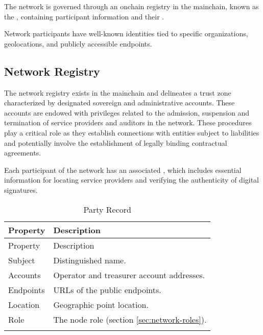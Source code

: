 \documentclass{oc}
\begin{document}
The network is governed through an onchain registry in the \gls{mainchain}, known as the , containing participant information and their .

Network participants have well-known identities tied to specific organizations, geolocations, and publicly accessible endpoints.

\subsection{Network Registry}\label{sec:network-registry}

The network registry exists in the \gls{mainchain} and delineates a trust zone characterized by designated sovereign and administrative accounts.
These accounts are endowed with privileges related to the admission, suspension and termination of service providers and auditors in the network.
These procedures play a critical role as they establish connections with entities subject to liabilities and potentially involve the establishment of legally binding contractual agreements.

Each participant of the network has an associated , which includes essential information for locating service providers and verifying the authenticity of digital signatures.

\begin{xltabular}{\linewidth}{ l  X }
  \caption{Party Record} 
  \label{table:party-record}\\
  \toprule
   Property & Description  \\
  \midrule
  \endfirsthead
   Property & Description  \\
  \midrule
  \endhead
  \bottomrule
  \endfoot
  
  Subject &  Distinguished name\cite{x510}. \\ \addlinespace

  Accounts & Operator and treasurer account addresses. \\ \addlinespace
    
  Endpoints & URLs\cite{rfc3986} of the public endpoints. \\  \addlinespace
  
  Location & Geographic point location\cite{iso6709}. \\  \addlinespace
    
  Role & The node role (section \ref{sec:network-roles}). \\ \addlinespace
  
\end{xltabular}
\end{document}
